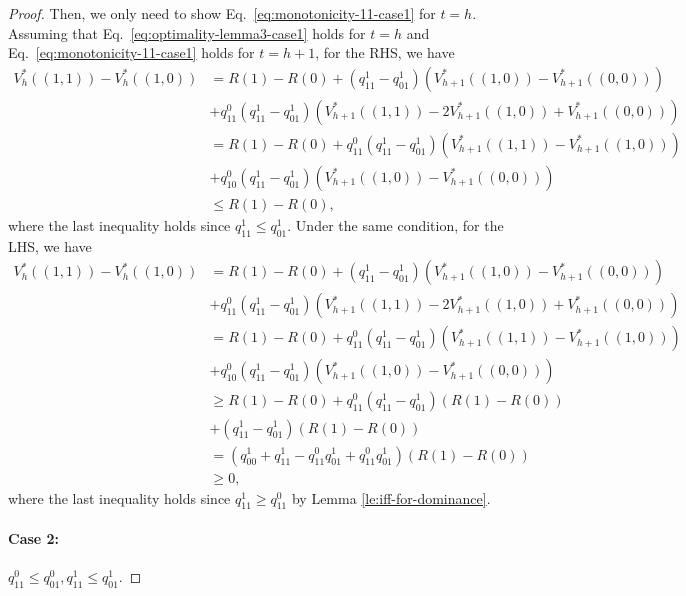 \begin{proof}
Then, we only need to show Eq.~\eqref{eq:monotonicity-11-case1} for $t=h$. Assuming that Eq.~\eqref{eq:optimality-lemma3-case1} holds for $t=h$ and Eq.~\eqref{eq:monotonicity-11-case1} holds for $t=h+1$, for the RHS, we have
\begin{align*}
    V_{h}^*\left((1,1)\right)-V_h^*\left((1,0)\right)&=R(1)-R(0)+\left(q^1_{11}-q^1_{01}\right)\left(V_{h+1}^*\left((1,0)\right)-V_{h+1}^*\left((0,0)\right)\right)\\
    &+q^0_{11}\left(q^1_{11}-q^1_{01}\right)\left(V_{h+1}^*\left((1,1)\right)-2V_{h+1}^*\left((1,0)\right)+V_{h+1}^*\left((0,0)\right)\right)\\
    &=R(1)-R(0)+q^0_{11}\left(q^1_{11}-q^1_{01}\right)\left(V_{h+1}^*\left((1,1)\right)-V_{h+1}^*\left((1,0)\right)\right)\\&+q^0_{10}\left(q^1_{11}-q^1_{01}\right)\left(V_{h+1}^*\left((1,0)\right)-V_{h+1}^*\left((0,0)\right)\right)\\
    &\leq R(1)-R(0),
\end{align*}
where the last inequality holds since $q^1_{11}\leq q^1_{01}$. 
Under the same condition, for the LHS, we have
\begin{align*}
    V_{h}^*\left((1,1)\right)-V_h^*\left((1,0)\right)&=R(1)-R(0)+\left(q^1_{11}-q^1_{01}\right)\left(V_{h+1}^*\left((1,0)\right)-V_{h+1}^*\left((0,0)\right)\right)\\
    &+q^0_{11}\left(q^1_{11}-q^1_{01}\right)\left(V_{h+1}^*\left((1,1)\right)-2V_{h+1}^*\left((1,0)\right)+V_{h+1}^*\left((0,0)\right)\right)\\
    &= R(1)-R(0)+q^0_{11}\left(q^1_{11}-q^1_{01}\right)\left(V_{h+1}^*\left((1,1)\right)-V_{h+1}^*\left((1,0)\right)\right)\\&+q^0_{10}\left(q^1_{11}-q^1_{01}\right)\left(V_{h+1}^*\left((1,0)\right)-V_{h+1}^*\left((0,0)\right)\right)\\
    &\geq R(1)-R(0)+q^0_{11}\left(q^1_{11}-q^1_{01}\right)(R(1)-R(0))\\
    &+\left(q^1_{11}-q^1_{01}\right)(R(1)-R(0))\\
    &=\left(q^1_{00}+q^1_{11}-q^0_{11}q^1_{01}+q^0_{11}q^1_{01}\right)(R(1)-R(0))\\
    &\geq 0,
\end{align*}
where the last inequality holds since $q^1_{11}\geq q^0_{11}$ by Lemma \ref{le:iff-for-dominance}.

\paragraph{Case 2:} $q^0_{11}\leq q^0_{01},q^1_{11}\leq q^1_{01}$. 


\end{proof}
